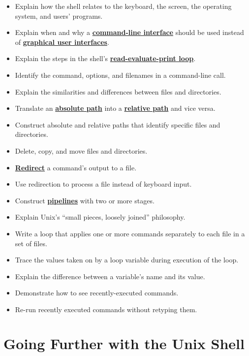 \documentclass[
]{krantz}
\providecommand{\tightlist}{%
  \setlength{\itemsep}{0pt}\setlength{\parskip}{0pt}}
\newcommand{\gref}[2]{\hyperlink{#2}{\textbf{#1}}}
\begin{document}
\begin{itemize}
\tightlist
\item
  Explain how the shell relates to the keyboard, the screen, the operating system, and users' programs.
\item
  Explain when and why a \gref{command-line interface}{cli} should be used instead of \gref{graphical user interfaces}{gui}.
\item
  Explain the steps in the shell's \gref{read-evaluate-print loop}{repl}.
\item
  Identify the command, options, and filenames in a command-line call.
\item
  Explain the similarities and differences between files and directories.
\item
  Translate an \gref{absolute path}{absolute\_path} into a \gref{relative path}{relative\_path} and vice versa.
\item
  Construct absolute and relative paths that identify specific files and directories.
\item
  Delete, copy, and move files and directories.
\item
  \gref{Redirect}{redirection} a command's output to a file.
\item
  Use redirection to process a file instead of keyboard input.
\item
  Construct \gref{pipelines}{pipe\_shell} with two or more stages.
\item
  Explain Unix's ``small pieces, loosely joined'' philosophy.
\item
  Write a loop that applies one or more commands separately to each file in a set of files.
\item
  Trace the values taken on by a loop variable during execution of the loop.
\item
  Explain the difference between a variable's name and its value.
\item
  Demonstrate how to see recently-executed commands.
\item
  Re-run recently executed commands without retyping them.
\end{itemize}

\hypertarget{going-further-with-the-unix-shell}{%
\section{Going Further with the Unix Shell}\label{going-further-with-the-unix-shell}}
\end{document}
